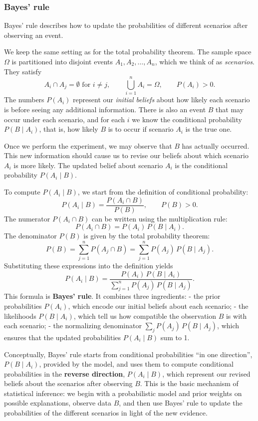 \subsubsection{Bayes' rule}

Bayes’ rule describes how to update the probabilities of different scenarios after observing an event.

We keep the same setting as for the total probability theorem. The sample space \(\Omega\) is partitioned into disjoint events \(A_1, A_2, \dots, A_n\), which we think of as \textit{scenarios}. They satisfy
\[
A_i \cap A_j = \emptyset \text{ for } i \neq j, 
\qquad
\bigcup_{i=1}^n A_i = \Omega,
\qquad
P(A_i) > 0.
\]
The numbers \(P(A_i)\) represent our \textit{initial beliefs} about how likely each scenario is before seeing any additional information. There is also an event \(B\) that may occur under each scenario, and for each \(i\) we know the conditional probability \(P(B \mid A_i)\), that is, how likely \(B\) is to occur if scenario \(A_i\) is the true one.

Once we perform the experiment, we may observe that \(B\) has actually occurred. This new information should cause us to revise our beliefs about which scenario \(A_i\) is more likely. The updated belief about scenario \(A_i\) is the conditional probability \(P(A_i \mid B)\).

To compute \(P(A_i \mid B)\), we start from the definition of conditional probability:
\[
P(A_i \mid B) = \frac{P(A_i \cap B)}{P(B)},
\qquad P(B) > 0.
\]
The numerator \(P(A_i \cap B)\) can be written using the multiplication rule:
\[
P(A_i \cap B) = P(A_i)\,P(B \mid A_i).
\]
The denominator \(P(B)\) is given by the total probability theorem:
\[
P(B) = \sum_{j=1}^n P(A_j \cap B)
     = \sum_{j=1}^n P(A_j)\,P(B \mid A_j).
\]
Substituting these expressions into the definition yields
\[
P(A_i \mid B)
= \frac{P(A_i)\,P(B \mid A_i)}{\sum_{j=1}^n P(A_j)\,P(B \mid A_j)}.
\]
This formula is \textbf{Bayes’ rule}. It combines three ingredients:
- the prior probabilities \(P(A_i)\), which encode our initial beliefs about each scenario;
- the likelihoods \(P(B \mid A_i)\), which tell us how compatible the observation \(B\) is with each scenario;
- the normalizing denominator \(\sum_j P(A_j)\,P(B \mid A_j)\), which ensures that the updated probabilities \(P(A_i \mid B)\) sum to 1.

Conceptually, Bayes’ rule starts from conditional probabilities “in one direction”, \(P(B \mid A_i)\), provided by the model, and uses them to compute conditional probabilities in the \textbf{reverse direction}, \(P(A_i \mid B)\), which represent our revised beliefs about the scenarios after observing \(B\). This is the basic mechanism of statistical inference: we begin with a probabilistic model and prior weights on possible explanations, observe data \(B\), and then use Bayes’ rule to update the probabilities of the different scenarios in light of the new evidence.


